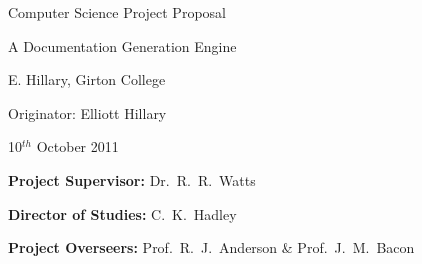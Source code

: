 \documentclass[10pt,twoside,a4paper]{article}
\begin{document}
\vfil

\centerline{\Large Computer Science Project Proposal}
\vspace{0.4in}
\centerline{\Large A Documentation Generation Engine }
\vspace{0.4in}
\centerline{\large E. Hillary, Girton College}
\vspace{0.3in}
\centerline{\large Originator: Elliott Hillary}
\vspace{0.3in}
\centerline{\large 10$^{th}$ October 2011}

\vfil


\noindent
{\bf Project Supervisor:} Dr.~R.~R.~Watts
\vspace{0.2in}

\noindent
{\bf Director of Studies:} C.~K.~Hadley
\vspace{0.2in}
\noindent

\noindent
{\bf Project Overseers:} Prof.~R.~J.~Anderson  \& Prof.~J.~M.~Bacon

\vfil

\tableofcontents


\end{document}
